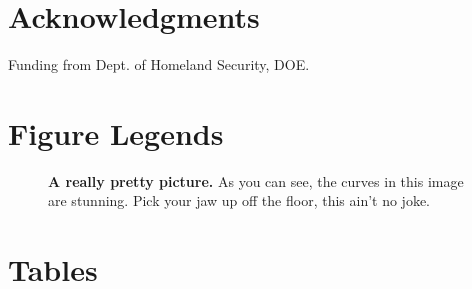 \documentclass[10pt]{article}
\begin{document}
\section*{Acknowledgments}
Funding from Dept. of Homeland Security, DOE.



\clearpage

\section*{Figure Legends}
\begin{figure}[hp]
\begin{center}
\end{center}
\caption{\textbf{A really pretty picture.} As you can see, the curves in this image are stunning.
Pick your jaw up off the floor, this ain't no joke.}
\label{fig:the_first_figure}
\end{figure}

\clearpage

\section*{Tables}


\clearpage
\end{document}
